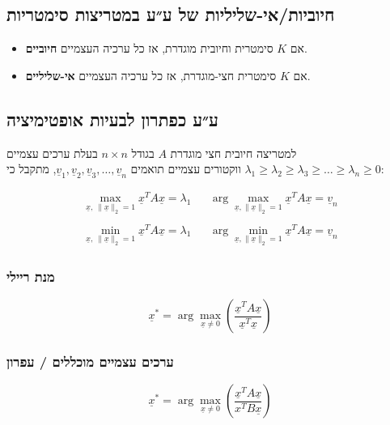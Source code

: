 \documentclass[11pt]{article}
\begin{document}
\subsection{חיוביות/אי-שליליות של ע״ע במטריצות סימטריות}
\label{sec:orgc0052ad}
\begin{itemize}
\item אם \(K\) סימטרית וחיובית מוגדרת, אז כל ערכיה העצמיים \textbf{חיוביים}.
\item אם \(K\) סימטרית חצי-מוגדרת, אז כל ערכיה העצמיים \textbf{אי-שליליים}.
\end{itemize}

\subsection{ע״ע כפתרון לבעיות אופטימיציה}
\label{sec:orga9b14c6}
למטריצה חיובית חצי מוגדרת \(A\) בגודל \(n\times n\) בעלת ערכים עצמיים \(\lambda_1 \ge \lambda_2 \ge \lambda_3 \ge \ldots \ge \lambda_n \ge 0\)
ווקטורים עצמיים תואמים \(\underline{v}_1, \underline{v}_2, \underline{v}_3, \ldots, \underline{v}_n\), מתקבל כי:

\begin{align*}
  \max_{\underline{x},\ \|\underline{x}\|_2=1} \underline{x}^TA\underline{x} = \lambda_1
&&
\arg \max_{\underline{x},\|\underline{x}\|_2=1} \underline{x}^TA\underline{x}=\underline{v}_n \\ \\
\min_{\underline{x},\ \|\underline{x}\|_2=1} \underline{x}^TA\underline{x} = \lambda_1
&&
\arg \min_{\underline{x},\|\underline{x}\|_2=1} \underline{x}^TA\underline{x}=\underline{v}_n
\end{align*}

\subsubsection{מנת ריילי}
\label{sec:org7555a17}



\[
\underline{x}^{*} = \arg \max_{\underline{x} \ne 0} \left( \frac{\underline{x}^TA\underline{x}}{\underline{x}^T\underline{x}} \right)
\]

\subsubsection{ערכים עצמיים מוכללים / עפרון}
\label{sec:org06ec5c2}
\[
\underline{x}^{*} = \arg \max_{\underline{x} \ne 0} \left( \frac{\underline{x}^TA\underline{x}}{x^TB\underline{x}} \right)
\]
\end{document}

